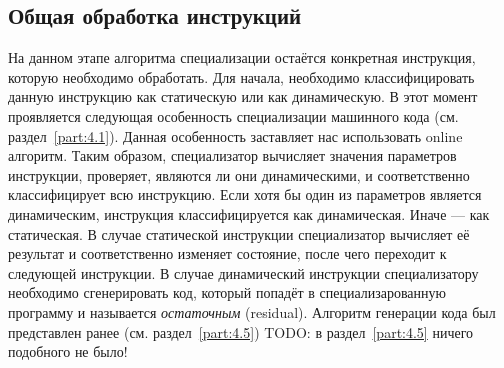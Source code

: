 \subsection{Общая обработка инструкций}
На данном этапе алгоритма специализации остаётся конкретная инструкция, которую необходимо обработать. Для начала, необходимо классифицировать данную инструкцию как статическую или как динамическую.
В этот момент проявляется следующая особенность специализации машинного кода (см. раздел~\ref{part:4.1}).
Данная особенность заставляет нас использовать online алгоритм. Таким образом, специализатор вычисляет значения параметров инструкции, проверяет, являются ли они динамическими, и соответственно классифицирует всю инструкцию. Если хотя бы один из параметров является динамическим, инструкция классифицируется как динамическая. Иначе --- как статическая.
В случае статической инструкции специализатор вычисляет её результат и соответственно изменяет состояние, после чего переходит к следующей инструкции.
В случае динамический инструкции специализатору необходимо сгенерировать код, который попадёт в специализарованную программу и называется
\emph{остаточным} (residual).
Алгоритм генерации кода был представлен ранее (см. раздел~\ref{part:4.5})
{\color{red}TODO: в раздел~\ref{part:4.5} ничего подобного не было!}

